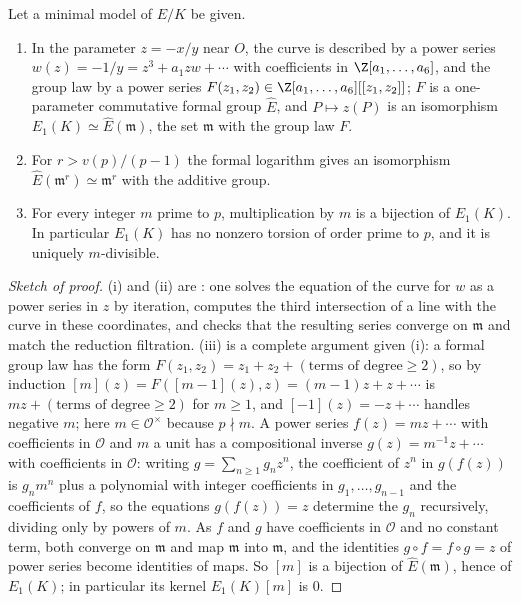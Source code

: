 \begin{theorem}\label{thm:reduction:formal-group}
Let a minimal model of $E/K$ be given.
\begin{enumerate}[label=(\roman*)]
\item In the parameter $z=-x/y$ near $O$, the curve is described by a power series $w(z)=-1/y=z^3+a_1zw+\cdots$
with coefficients in $\Z[a_1,\dots,a_6]$, and the group law by a power series $F(z_1,z_2)\in\Z[a_1,\dots,a_6][[z_1,z_2]]$;
$F$ is a one-parameter commutative formal group $\hat E$, and $P\mapsto z(P)$ is an isomorphism
$E_1(K)\simeq\hat E(\mathfrak m)$, the set $\mathfrak m$ with the group law $F$.
\item For $r>v(p)/(p-1)$ the formal logarithm gives an isomorphism $\hat E(\mathfrak m^r)\simeq\mathfrak m^r$ with
the additive group.
\item For every integer $m$ prime to $p$, multiplication by $m$ is a bijection of $E_1(K)$. In particular $E_1(K)$
has no nonzero torsion of order prime to $p$, and it is uniquely $m$-divisible.
\end{enumerate}
\end{theorem}

\begin{proof}[Sketch of proof]
(i) and (ii) are \cite[IV.1 to IV.6 and VII.2]{SilvermanAEC}: one solves the equation of the curve for $w$ as a
power series in $z$ by iteration, computes the third intersection of a line with the curve in these
coordinates, and checks that the resulting series converge on $\mathfrak m$ and match the reduction filtration.
(iii) is a complete argument given (i): a formal group law has the form $F(z_1,z_2)=z_1+z_2+(\text{terms of degree}\ge2)$,
so by induction $[m](z)=F([m-1](z),z)=(m-1)z+z+\cdots$ is $mz+(\text{terms of degree}\ge2)$ for $m\ge1$, and
$[-1](z)=-z+\cdots$ handles negative $m$; here $m\in\mathcal O^\times$ because $p\nmid m$. A power series $f(z)=mz+\cdots$ with
coefficients in $\mathcal O$ and $m$ a unit has a compositional inverse $g(z)=m^{-1}z+\cdots$ with coefficients in $\mathcal O$:
writing $g=\sum_{n\ge1}g_nz^n$, the coefficient of $z^n$ in $g(f(z))$ is $g_nm^n$ plus a polynomial with integer coefficients in
$g_1,\dots,g_{n-1}$ and the coefficients of $f$, so the equations $g(f(z))=z$ determine the $g_n$ recursively, dividing only by
powers of $m$. As $f$ and $g$ have coefficients in $\mathcal O$ and no constant term, both converge on $\mathfrak m$ and map
$\mathfrak m$ into $\mathfrak m$, and the identities $g\circ f=f\circ g=z$ of power series become identities of maps. So $[m]$ is a
bijection of $\hat E(\mathfrak m)$, hence of $E_1(K)$; in particular its kernel $E_1(K)[m]$ is $0$.
\end{proof}

